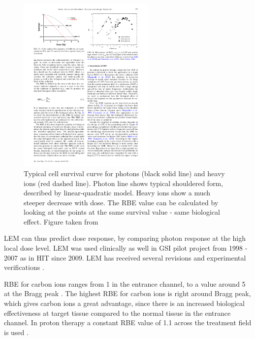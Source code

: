 \newpage

\begin{figure}[H]
\begin{center}
\includegraphics[width=0.6\textwidth]{./Fundamentals/Images/dose_dependence.pdf}
\caption{Typical cell survival curve for photons (black solid line) and heavy ions (red dashed line). Photon line shows typical shouldered form, described by linear-quadratic model.
Heavy ions show a much steeper decrease with dose. The RBE value can be calculated by looking at the points at the same survival value - same biological effect. Figure taken from \cite{Schardt2010}}
\label{dosedep}
\end{center}
\end{figure}

 
LEM can thus predict dose response, by comparing
photon response at the high local dose level. LEM was used clinically as well in GSI pilot project from 1998 - 2007 \cite{Kraemer2000, Kraemer2000a} as in HIT since 2009. LEM has received several revisions \cite{Elsaesser2006, Elsaesser2007, Elsaesser2009} and experimental verifications
\cite{Mitaroff1998, Kraemer2000a, Kraemer2003}. 

RBE for carbon ions ranges from 1 in the entrance channel, to a value around 5 at 
the Bragg peak \cite{Kraft2000}. The highest RBE for carbon ions is right around Bragg peak, which gives carbon ions a great advantage, since there is an increased 
biological effectiveness at target tissue compared to the normal tissue in the entrance channel. In proton therapy a constant RBE value of 1.1 across the treatment field
is used \cite{Paganetti2002}.


